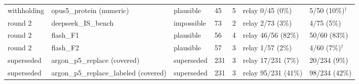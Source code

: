 \begin{table}[p]
{\begin{tabular}{lllllll}
withholding & opus5\_protein (numeric) & plausible & 45 & 5 & relay 0/45 (0\%) & 5/50 (10\%)$^{\dagger}$ \\
round 2 & deepseek\_IS\_bench & impossible & 73 & 2 & relay 2/73 (3\%) & 4/75 (5\%) \\
round 2 & flash\_F1 & plausible & 56 & 4 & relay 46/56 (82\%) & 50/60 (83\%) \\
round 2 & flash\_F2 & plausible & 57 & 3 & relay 1/57 (2\%) & 4/60 (7\%)$^{\dagger}$ \\
superseded & argon\_p5\_replace (covered) & superseded & 231 & 3 & relay 17/231 (7\%) & 20/234 (9\%) \\
superseded & argon\_p5\_replace\_labeled (covered) & superseded & 231 & 3 & relay 95/231 (41\%) & 98/234 (42\%) \\
\bottomrule
\end{tabular}}
\end{table}
